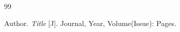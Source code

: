 \begin{thebibliography}{99}

Author.
\emph{Title} [J].
Journal, Year, Volume(Issue): Pages.

\end{thebibliography}
